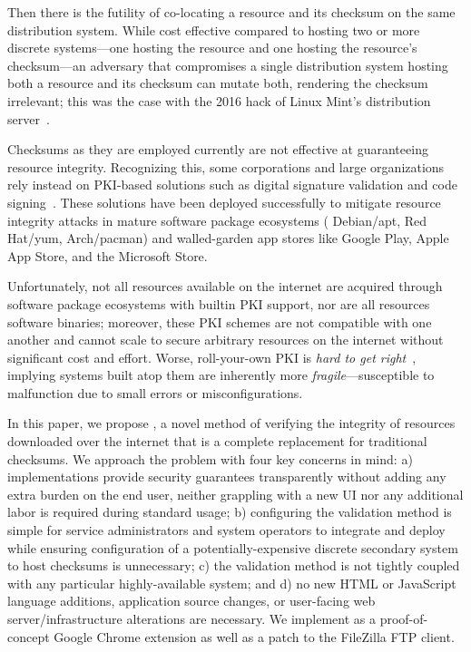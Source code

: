 Then there is the futility of co-locating a resource and its checksum on the same
distribution system. While cost effective compared to hosting two or more
discrete systems---one hosting the resource and one hosting the resource's
checksum---an adversary that compromises a single distribution system hosting
both a resource and its checksum can mutate both, rendering the checksum
irrelevant; this was the case with the 2016 hack of Linux Mint's distribution
server~\cite{SCA-MINT1, SCA-MINT2}.

Checksums as they are employed currently are not effective at guaranteeing
resource integrity. Recognizing this, some corporations and large organizations
rely instead on PKI-based solutions such as digital signature validation and
code signing~\cite{PKI}. These solutions have been deployed successfully to
mitigate resource integrity attacks in mature software package ecosystems (\eg
Debian/apt, Red Hat/yum, Arch/pacman) and walled-garden app stores like Google
Play, Apple App Store, and the Microsoft Store.


Unfortunately, not all resources available on the internet are acquired through
software package ecosystems with builtin PKI support, nor are all resources
software binaries; moreover, these PKI schemes are not compatible with one
another and cannot scale to secure arbitrary resources on the internet without
significant cost and effort. Worse, roll-your-own PKI is \emph{hard to get
right}~\cite{PKI}, implying systems built atop them are inherently more
\emph{fragile}---susceptible to malfunction due to small errors or
misconfigurations.

In this paper, we propose \SYSTEM{}, a novel method of verifying the integrity
of resources downloaded over the internet that is a complete replacement for
traditional checksums. We approach the problem with four key concerns in mind:
a) implementations provide security guarantees transparently without adding any
extra burden on the end user, \ie neither grappling with a new UI nor any
additional labor is required during standard usage; b) configuring the
validation method is simple for service administrators and system operators to
integrate and deploy while ensuring configuration of a potentially-expensive
discrete secondary system to host checksums is unnecessary; c) the validation
method is not tightly coupled with any particular highly-available system; and
d) no new HTML or JavaScript language additions, application source changes, or
user-facing web server/infrastructure alterations are necessary. We implement
\SYSTEM{} as a proof-of-concept Google Chrome extension as well as a patch to
the FileZilla FTP client.

